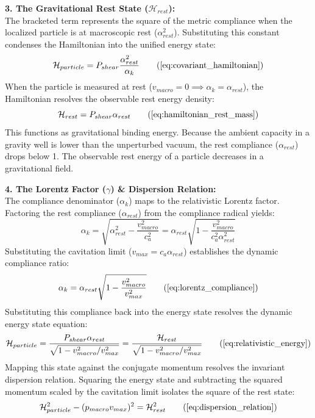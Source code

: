 \textbf{3. The Gravitational Rest State ($\mathcal{H}_{rest}$):} \\
The bracketed term represents the square of the metric compliance when the localized particle is at macroscopic rest ($\alpha_{rest}^2$). Substituting this constant condenses the Hamiltonian into the unified energy state: 
\begin{equation}
    \mathcal{H}_{particle} = P_{shear} \frac{\alpha_{rest}^2}{\alpha_k} \tag{\ref{eq:covariant_hamiltonian}}
\end{equation}
When the particle is measured at rest ($v_{macro} = 0 \implies \alpha_k = \alpha_{rest}$), the Hamiltonian resolves the observable rest energy density: 
\begin{equation}
    \mathcal{H}_{rest} = P_{shear} \alpha_{rest} \tag{\ref{eq:hamiltonian_rest_mass}}
\end{equation}
This functions as gravitational binding energy. Because the ambient capacity in a gravity well is lower than the unperturbed vacuum, the rest compliance ($\alpha_{rest}$) drops below 1. The observable rest energy of a particle decreases in a gravitational field. 

\textbf{4. The Lorentz Factor ($\gamma$) \& Dispersion Relation:} \\
The compliance denominator ($\alpha_k$) maps to the relativistic Lorentz factor. Factoring the rest compliance ($\alpha_{rest}$) from the compliance radical yields: 
\begin{equation}
    \alpha_k = \sqrt{\alpha_{rest}^2 - \frac{v_{macro}^2}{c_a^2}} = \alpha_{rest} \sqrt{1 - \frac{v_{macro}^2}{c_a^2 \alpha_{rest}^2}} \nonumber
\end{equation}
Substituting the cavitation limit ($v_{max} = c_a \alpha_{rest}$) establishes the dynamic compliance ratio:
\begin{equation}
    \alpha_k = \alpha_{rest} \sqrt{1 - \frac{v_{macro}^2}{v_{max}^2}} \tag{\ref{eq:lorentz_compliance}}
\end{equation}
Substituting this compliance back into the energy state resolves the dynamic energy state equation:
\begin{equation}
    \mathcal{H}_{particle} = \frac{P_{shear} \alpha_{rest}}{\sqrt{1 - v_{macro}^2/v_{max}^2}} = \frac{\mathcal{H}_{rest}}{\sqrt{1 - v_{macro}^2/v_{max}^2}} \tag{\ref{eq:relativistic_energy}}
\end{equation}
Mapping this state against the conjugate momentum resolves the invariant dispersion relation. Squaring the energy state and subtracting the squared momentum scaled by the cavitation limit isolates the square of the rest state: 
\begin{equation}
    \mathcal{H}_{particle}^2 - (p_{macro} v_{max})^2 = \mathcal{H}_{rest}^2 \tag{\ref{eq:dispersion_relation}}
\end{equation}

